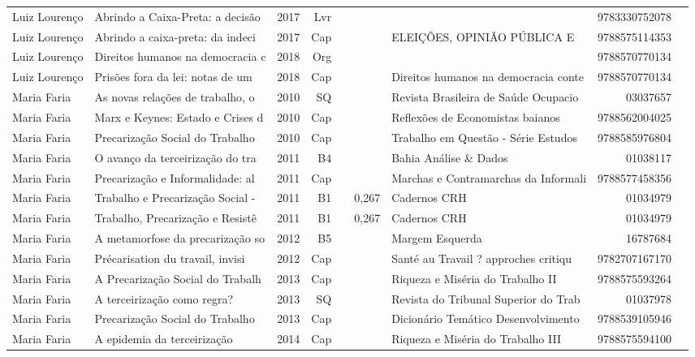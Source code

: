 \documentclass[12pt,brazil]{article}\usepackage[]{graphicx}\usepackage[]{xcolor}
\begin{document}
\begin{longtable}{lllrrllrr}
Luiz Lourenço & Abrindo a Caixa-Preta: a decisão & 2017 & Lvr &  &  &  & 9783330752078 \\
Luiz Lourenço & Abrindo a caixa-preta: da indeci & 2017 & Cap &  &  & ELEIÇÕES, OPINIÃO PÚBLICA E & 9788575114353 \\
Luiz Lourenço & Direitos humanos na democracia c & 2018 & Org &  &  &  & 9788570770134 \\
Luiz Lourenço & Prisões fora da lei: notas de um & 2018 & Cap &  &  & Direitos humanos na democracia conte & 9788570770134 \\
Maria Faria & As novas relações de trabalho, o & 2010 & SQ &  &  & Revista Brasileira de Saúde Ocupacio & 03037657 \\
Maria Faria & Marx e Keynes: Estado e Crises d & 2010 & Cap &  &  & Reflexões de Economistas baianos & 9788562004025 \\
Maria Faria & Precarização Social do Trabalho  & 2010 & Cap &  &  & Trabalho em Questão - Série Estudos  & 9788585976804 \\
Maria Faria & O avanço da terceirização do tra & 2011 & B4 &  &  & Bahia Análise \& Dados & 01038117 \\
Maria Faria & Precarização e Informalidade: al & 2011 & Cap &  &  & Marchas e Contramarchas da Informali & 9788577458356 \\
Maria Faria & Trabalho e Precarização Social - & 2011 & B1 &  & 0,267 & Cadernos CRH & 01034979 \\
Maria Faria & Trabalho, Precarização e Resistê & 2011 & B1 &  & 0,267 & Cadernos CRH & 01034979 \\
Maria Faria & A metamorfose da precarização so & 2012 & B5 &  &  & Margem Esquerda & 16787684 \\
Maria Faria & Précarisation du travail, invisi & 2012 & Cap &  &  & Santé au Travail ? approches critiqu & 9782707167170 \\
Maria Faria & A Precarização Social do Trabalh & 2013 & Cap &  &  & Riqueza e Miséria do Trabalho II & 9788575593264 \\
Maria Faria & A terceirização como regra? & 2013 & SQ &  &  & Revista do Tribunal Superior do Trab & 01037978 \\
\rowcolor{duplic}Maria Faria & Precarização Social do Trabalho & 2013 & Cap &  &  & Dicionário Temático Desenvolvimento  & 9788539105946 \\
Maria Faria & A epidemia da terceirização & 2014 & Cap &  &  & Riqueza e Miséria do Trabalho III & 9788575594100 \\

\end{longtable}
\end{document}
